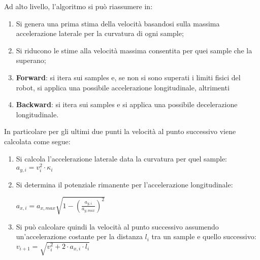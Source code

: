Ad alto livello, l'algoritmo si può riassumere in:
\begin{enumerate}
	\item Si genera una prima stima della velocità basandosi sulla massima accelerazione laterale per la
	      curvatura di ogni sample;
	\item Si riducono le stime alla velocità massima consentita per quei sample che la superano;
	\item \textbf{Forward}: si itera sui samples e, se non si sono superati i limiti fisici del robot, si
		applica una possibile accelerazione longitudinale, altrimenti
	\item \textbf{Backward}: si itera sui samples e si applica una possibile decelerazione longitudinale.
\end{enumerate}
In particolare per gli ultimi due punti la velocità al punto successivo viene calcolata come segue:
\begin{enumerate}

	\item \raggedright Si calcola l'accelerazione laterale data la curvatura per quel sample:\\
	      \centering $a_{y,i} = v_i^2 \cdot \kappa_i$ 

	\raggedright
	\item Si determina il potenziale rimanente per l'accelerazione longitudinale:\\
	      \begin{center}
			  $a_{x,i} = a_{x,max} \sqrt{\displaystyle 1- \left(\frac{a_{y,i}}{a_{y,max}}\right)^2}$
		  \end{center}

	\item Si può calcolare quindi la velocità al punto successivo assumendo un'accelerazione costante per
		la distanza $l_i$ tra un sample e quello successivo:\\
		\centering $v_{i+1} = \sqrt{v_i^2 + 2 \cdot a_{x,i} \cdot l_i}$
\end{enumerate}
